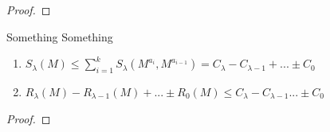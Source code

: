 \documentclass[a4paper,11pt]{article}
\begin{document}
\begin{proof}


\end{proof}

\begin{lemma}
   \label{lemma:strung morse inequalities}
   Something Something
   \begin{enumerate}
      \item $ S_{\lambda}(M) \leq \sum_{i = 1}^k S_{\lambda}(M^{a_i}, M^{a_{i-1}}) = C_{\lambda} - C_{\lambda - 1} + ... \pm C_0 $
      \item $ R_{\lambda}(M) - R_{\lambda - 1}(M) + ... \pm R_0(M) \leq C_{\lambda} - C_{\lambda - 1} ... \pm C_0 $
   \end{enumerate}
\end{lemma}

\begin{proof}

\end{proof}

\end{document}
